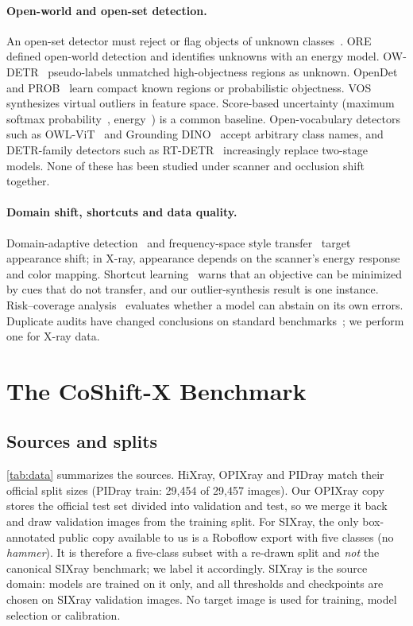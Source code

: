 \documentclass[10pt,twocolumn,letterpaper]{article}
\begin{document}
\paragraph{Open-world and open-set detection.}
An open-set detector must reject or flag objects of unknown classes~\cite{dhamija2020overlooked}. ORE~\cite{joseph2021ore} defined open-world detection and identifies unknowns with an energy model. OW-DETR~\cite{gupta2022owdetr} pseudo-labels unmatched high-objectness regions as unknown. OpenDet~\cite{han2022opendet} and PROB~\cite{zohar2023prob} learn compact known regions or probabilistic objectness. VOS~\cite{du2022vos} synthesizes virtual outliers in feature space. Score-based uncertainty (maximum softmax probability~\cite{hendrycks2017msp}, energy~\cite{liu2020energy}) is a common baseline. Open-vocabulary detectors such as OWL-ViT~\cite{minderer2022owlvit} and Grounding DINO~\cite{liu2024gdino} accept arbitrary class names, and DETR-family detectors such as RT-DETR~\cite{zhao2024rtdetr} increasingly replace two-stage models. None of these has been studied under scanner and occlusion shift together.
\paragraph{Domain shift, shortcuts and data quality.}
Domain-adaptive detection~\cite{chen2018dafaster} and frequency-space style transfer~\cite{yang2020fda} target appearance shift; in X-ray, appearance depends on the scanner's energy response and color mapping. Shortcut learning~\cite{geirhos2020shortcut} warns that an objective can be minimized by cues that do not transfer, and our outlier-synthesis result is one instance. Risk--coverage analysis~\cite{geifman2017selective} evaluates whether a model can abstain on its own errors. Duplicate audits have changed conclusions on standard benchmarks~\cite{recht2019imagenet,barz2020cifair}; we perform one for X-ray data.

\section{The CoShift-X Benchmark}
\label{sec:benchmark}
\subsection{Sources and splits}
\cref{tab:data} summarizes the sources. HiXray, OPIXray and PIDray match their official split sizes (PIDray train: 29{,}454 of 29{,}457 images). Our OPIXray copy stores the official test set divided into validation and test, so we merge it back and draw validation images from the training split. For SIXray, the only box-annotated public copy available to us is a Roboflow export with five classes (no \emph{hammer}). It is therefore a five-class subset with a re-drawn split and \emph{not} the canonical SIXray benchmark; we label it accordingly. SIXray is the source domain: models are trained on it only, and all thresholds and checkpoints are chosen on SIXray validation images. No target image is used for training, model selection or calibration.
\end{document}
